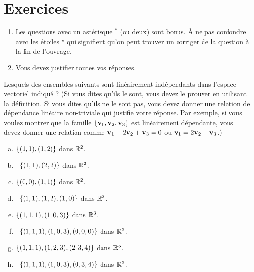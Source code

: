 \section*{Exercices}

\begin{enumerate}
\item Les questions avec un astérisque $ ^\ast$ (ou deux) sont bonus. À ne pas confondre avec les étoiles ${}^\star$ qui signifient qu'on peut trouver un corriger de la question à la fin de l'ouvrage.
 \item Vous devez justifier toutes vos réponses.
\end{enumerate}
\bigskip


\begin{prob} \label{prob07.1} Lesquels des ensembles suivants sont linéairement indépendants dans l'espace vectoriel indiqué ? (Si vous dites qu'ils le sont, vous devez le prouver en utilisant la définition. Si vous dites qu'ils ne le sont pas, vous devez donner une relation de dépendance linéaire non-triviale qui justifie votre réponse. Par exemple, si vous voulez montrer que la famille $\{\mathbf{v}_1, \mathbf{v}_2, \mathbf{v}_3\}$ est linéairement dépendante, vous devez donner une relation comme  $\mathbf{v}_1-2 \mathbf{v}_2 +\mathbf{v}_3=0$ ou $\mathbf{v}_1=2 \mathbf{v}_2 -\mathbf{v}_3$.)
\medskip
\begin{enumerate}[a)]
\item $\{(1,1), (1, 2)\}$ dans $\mathbb{R}^2$.
\medskip
 
\item\sov~$\{(1,1), (2, 2)\}$ dans $\mathbb{R}^2$.
\medskip
 


\item $\{(0,0), (1, 1)\}$ dans $\mathbb{R}^2$.
\medskip
 
\item\sov~$\{(1,1), (1, 2), (1,0)\}$ dans $\mathbb{R}^2$.

\medskip
 
\item $\{(1,1,1), (1,0,3)\}$ dans $\mathbb{R}^3$.
\medskip
 
\item\sov~$\{(1,1,1), (1,0,3), (0,0,0)\}$ dans $\mathbb{R}^3$.

\medskip
 
\item $\{(1,1,1), (1,2,3), (2,3,4)\}$ dans $\mathbb{R}^3$.
\medskip
 
 
\item\sov~$\{(1,1,1), (1,0,3), (0,3,4)\}$ dans $\mathbb{R}^3$.



\end{enumerate}
\end{prob}
